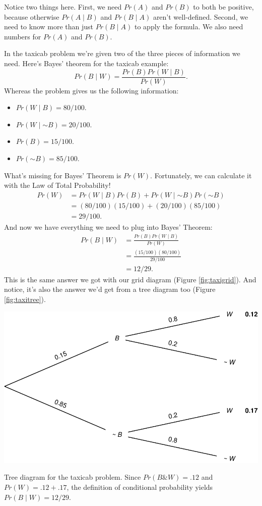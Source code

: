 \documentclass[justified]{tufte-book}
\providecommand{\tightlist}{%
  \setlength{\itemsep}{0pt}\setlength{\parskip}{0pt}}
\newcommand{\given}{\mid}
\renewcommand{\neg}{\mathbin{\sim}}
\renewcommand{\wedge}{\mathbin{\&}}
\newcommand{\p}{Pr}
\theoremstyle{definition}
\theoremstyle{definition}
\theoremstyle{definition}
\theoremstyle{remark}
\begin{document}
Notice two things here. First, we need \(\p(A)\) and \(\p(B)\) to both
be positive, because otherwise \(\p(A \given B)\) and \(\p(B \given A)\)
aren't well-defined. Second, we need to know more than just
\(\p(B \given A)\) to apply the formula. We also need numbers for
\(\p(A)\) and \(\p(B)\).

In the taxicab problem we're given two of the three pieces of
information we need. Here's Bayes' theorem for the taxicab example:
\[ \p(B \given W) = \frac{\p(B) \p(W \given B)}{\p(W)}. \] Whereas the
problem gives us the following information:

\begin{itemize}
\tightlist
\item
  \(\p(W \given B) = 80/100\).
\item
  \(\p(W \given \neg B) = 20/100\).
\item
  \(\p(B) = 15/100\).
\item
  \(\p(\neg B) = 85/100\).
\end{itemize}

What's missing for Bayes' Theorem is \(\p(W)\). Fortunately, we can
calculate it with the Law of Total Probability! \[
  \begin{aligned}
    \p(W) &= \p(W \given B)\p(B) + \p(W \given \neg B)\p(\neg B)\\
          &= (80/100)(15/100) + (20/100)(85/100)\\
          &= 29/100.
  \end{aligned}
\] And now we have everything we need to plug into Bayes' Theorem: \[
  \begin{aligned}
    \p(B \given W) &= \frac{\p(B) \p(W \given B)}{\p(W)}\\
                   &= \frac{(15/100)(80/100)}{29/100}\\
                   &= 12/29.
  \end{aligned}
\] This is the same answer we got with our grid diagram (Figure
\ref{fig:taxigrid}). And notice, it's also the answer we'd get from a
tree diagram too (Figure \ref{fig:taxitree}).

\begin{marginfigure}
\includegraphics{_main_files/figure-latex/taxitree-1} \caption[Tree diagram for the taxicab problem]{Tree diagram for the taxicab problem. Since $\p(B \wedge W) = .12$ and $\p(W) = .12 + .17$, the definition of conditional probability yields $\p(B \given W) = 12/29$.}\label{fig:taxitree}
\end{marginfigure}
\end{document}
